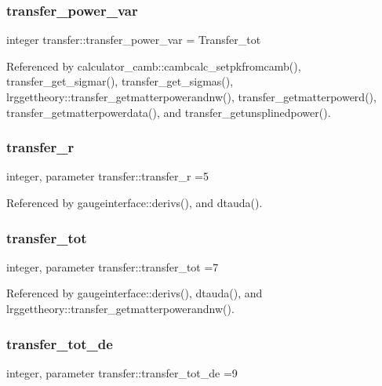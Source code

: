 \subsubsection{\texorpdfstring{transfer\+\_\+power\+\_\+var}{transfer\_power\_var}}
{\footnotesize\ttfamily integer transfer\+::transfer\+\_\+power\+\_\+var = Transfer\+\_\+tot}



Referenced by calculator\+\_\+camb\+::cambcalc\+\_\+setpkfromcamb(), transfer\+\_\+get\+\_\+sigmar(), transfer\+\_\+get\+\_\+sigmas(), lrggettheory\+::transfer\+\_\+getmatterpowerandnw(), transfer\+\_\+getmatterpowerd(), transfer\+\_\+getmatterpowerdata(), and transfer\+\_\+getunsplinedpower().

\mbox{\label{namespacetransfer_a55264fe59289090c8c796b22c71d5937}} 
\subsubsection{\texorpdfstring{transfer\+\_\+r}{transfer\_r}}
{\footnotesize\ttfamily integer, parameter transfer\+::transfer\+\_\+r =5}



Referenced by gaugeinterface\+::derivs(), and dtauda().

\mbox{\label{namespacetransfer_a96bc38e4fa7d41872d481db49a3e5f46}} 
\subsubsection{\texorpdfstring{transfer\+\_\+tot}{transfer\_tot}}
{\footnotesize\ttfamily integer, parameter transfer\+::transfer\+\_\+tot =7}



Referenced by gaugeinterface\+::derivs(), dtauda(), and lrggettheory\+::transfer\+\_\+getmatterpowerandnw().

\mbox{\label{namespacetransfer_a3ae9f7a69bc80c029fe96b8a1de263b3}} 
\subsubsection{\texorpdfstring{transfer\+\_\+tot\+\_\+de}{transfer\_tot\_de}}
{\footnotesize\ttfamily integer, parameter transfer\+::transfer\+\_\+tot\+\_\+de =9}



